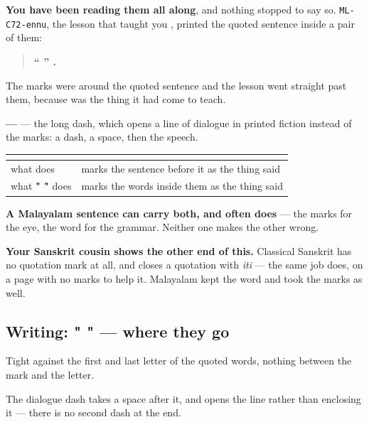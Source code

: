 \textbf{You have been reading them all along}, and nothing stopped to say so. \texttt{ML-C72-ennu}, the lesson that taught you \textbf{}, printed the quoted sentence inside a pair of them:

\begin{quote}
\textbf{\textquotedblleft{}  \textquotedblright{}   .}
\end{quote}

The marks were around the quoted sentence and the lesson went straight past them, because \textbf{} was the thing it had come to teach.

\textbf{—} — the long dash, which opens a line of dialogue in printed fiction instead of the marks: a dash, a space, then the speech.

\begin{grammarlens}[title={Grammar Lens: the marker and the marks do the same job twice}]
\noindent
\begin{tabularx}{\linewidth}{@{}>{\raggedright\arraybackslash}X>{\raggedright\arraybackslash}X@{}}
\toprule
\textbf{} & \textbf{} \\
\midrule
what \textbf{\ml{എന്ന്}} does & marks the sentence before it as the thing said \\
what \textbf{" "} does & marks the words inside them as the thing said \\
\bottomrule
\end{tabularx}

\textbf{A Malayalam sentence can carry both, and often does} — the marks for the eye, the word for the grammar. Neither one makes the other wrong.

\textbf{Your Sanskrit cousin shows the other end of this.} Classical Sanskrit has no quotation mark at all, and closes a quotation with \textbf{} \emph{iti} — the same job \textbf{} does, on a page with no marks to help it. Malayalam kept the word and took the marks as well.
\end{grammarlens}

\subsection*{Writing: " " — where they go}
Tight against the first and last letter of the quoted words, nothing between the mark and the letter.

The dialogue dash takes a space after it, and opens the line rather than enclosing it — there is no second dash at the end.

